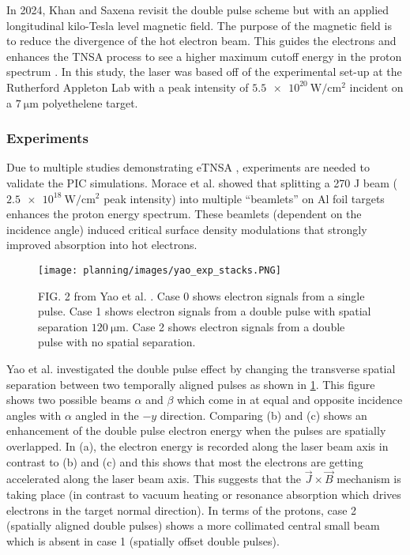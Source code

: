 In 2024, Khan and Saxena \cite{Khan_2024_NJoP} revisit the double pulse scheme but with an applied longitudinal kilo-Tesla level magnetic field. The purpose of the magnetic field is to reduce the divergence of the hot electron beam. This guides the electrons and enhances the \gls{TNSA} process to see a higher maximum cutoff energy in the proton spectrum \cite{Arefiev_2016_NJoP}. In this study, the laser was based off of the experimental set-up at the Rutherford Appleton Lab with a peak intensity of $\SI{5.5e20}{\watt \per \centi \meter \squared}$ incident on a $\SI{7}{\micro \meter}$ polyethelene target. 


\subsubsection{Experiments}

Due to multiple studies demonstrating \gls{eTNSA} \cite{Ferri_2019_Nat_Comm,Rahman_2021_PoP,Khan_2024_NJoP}, experiments are needed to validate the \gls{PIC} simulations. Morace et al. \cite{Morace_2019_Nat_Comm} showed that splitting a 270 J beam ($\SI{2.5e18}{\watt \per \centi \meter \squared}$ peak intensity) into multiple ``beamlets'' on Al foil targets enhances the proton energy spectrum. These beamlets (dependent on the incidence angle) induced critical surface density modulations that strongly improved absorption into hot electrons. 

\begin{figure}
	\centering 
	\texttt{[image: planning/images/yao\_exp\_stacks.PNG]}
	\caption{FIG. 2 from Yao et al. \cite{Yao_2024_MaRaE}. Case 0 shows electron signals from a single pulse. Case 1 shows electron signals from a double pulse with spatial separation $\SI{120}{\micro \meter}$. Case 2 shows electron signals from a double pulse with no spatial separation.}
	\label{fig:yao_exp_stacks}
\end{figure}

Yao et al. \cite{Yao_2024_MaRaE} investigated the double pulse effect by changing the transverse spatial separation between two temporally aligned pulses as shown in \cref{fig:yao_exp_stacks}. This figure shows two possible beams $\alpha$ and $\beta$ which come in at equal and opposite incidence angles with $\alpha$ angled in the $-y$ direction. Comparing (b) and (c) shows an enhancement of the double pulse electron energy when the pulses are spatially overlapped. In (a), the electron energy is recorded along the laser beam axis in contrast to (b) and (c) and this shows that most the electrons are getting accelerated along the laser beam axis. This suggests that the $\vec{J} \times \vec{B}$ mechanism is taking place (in contrast to vacuum heating or resonance absorption which drives electrons in the  target normal direction). In terms of the protons, case 2 (spatially aligned double pulses) shows a more collimated central small beam which is absent in case 1 (spatially offset double pulses).

